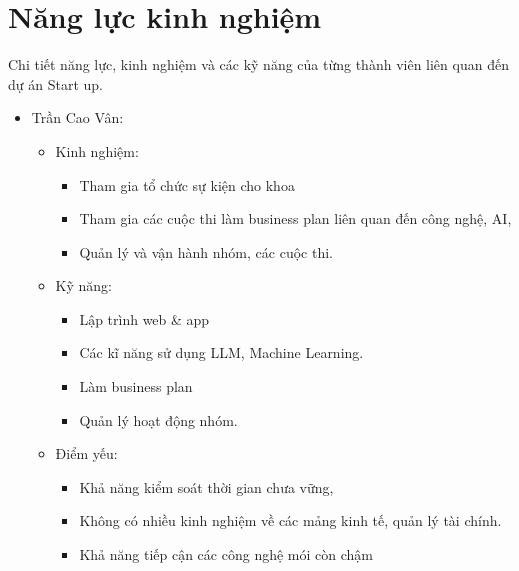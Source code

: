 \section{Năng lực kinh nghiệm}

Chi tiết năng lực, kinh nghiệm và các kỹ năng của từng thành viên liên quan đến dự án Start up.

\begin{itemize}
    \item Trần Cao Vân:
    \begin{itemize}
        \item Kinh nghiệm: 
        \begin{itemize}
            \item Tham gia tổ chức sự kiện cho khoa
            \item Tham gia các cuộc thi làm business plan liên quan đến công nghệ, AI, 
            \item Quản lý và vận hành nhóm, các cuộc thi.
        \end{itemize}
        \item Kỹ năng: 
        \begin{itemize}
            \item Lập trình web \& app
            \item Các kĩ năng sử dụng LLM, Machine Learning.
            \item Làm business plan 
            \item Quản lý hoạt động nhóm.
        \end{itemize}
        \item Điểm yếu: 
        \begin{itemize}
            \item Khả năng kiểm soát thời gian chưa vững, 
            \item Không có nhiều kinh nghiệm về các mảng kinh tế, quản lý tài chính.
            \item Khả năng tiếp cận các công nghệ mói còn chậm
        \end{itemize}
    \end{itemize}


\end{itemize}
